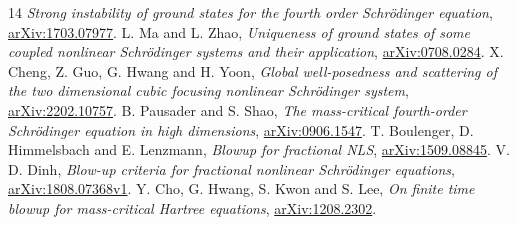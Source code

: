 \documentclass[11pt,a4paper]{article}
\theoremstyle{remark}\newtheorem{remark}[theorem]{Remark}
\begin{document}
\begin{thebibliography}{14}
\emph{Strong instability of ground states for the fourth order
Schr\"odinger equation},
\href{https://arxiv.org/abs/1703.07977}{arXiv:1703.07977}.
 L. Ma and L. Zhao,
\emph{Uniqueness of ground states of some coupled nonlinear Schr\"odinger
systems and their application},
\href{https://arxiv.org/abs/0708.0284}{arXiv:0708.0284}.
 X. Cheng, Z. Guo, G. Hwang and H. Yoon,
\emph{Global well-posedness and scattering of the two dimensional cubic
focusing nonlinear Schr\"odinger system},
\href{https://arxiv.org/abs/2202.10757}{arXiv:2202.10757}.
 B. Pausader and S. Shao,
\emph{The mass-critical fourth-order Schr\"odinger equation in high dimensions},
\href{https://arxiv.org/abs/0906.1547}{arXiv:0906.1547}.
 T. Boulenger, D. Himmelsbach and E. Lenzmann,
\emph{Blowup for fractional NLS},
\href{https://arxiv.org/abs/1509.08845}{arXiv:1509.08845}.
 V. D. Dinh,
\emph{Blow-up criteria for fractional nonlinear Schr\"odinger equations},
\href{https://arxiv.org/abs/1808.07368}{arXiv:1808.07368v1}.
 Y. Cho, G. Hwang, S. Kwon and S. Lee,
\emph{On finite time blowup for mass-critical Hartree equations},
\href{https://arxiv.org/abs/1208.2302}{arXiv:1208.2302}.
\end{thebibliography}
\end{document}
